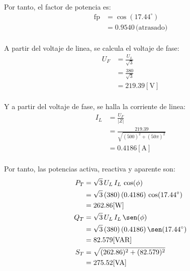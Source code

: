 \documentclass[letter,11pt]{article}
\begin{document}
Por tanto, el factor de potencia es:
\begin{equation*}
    \begin{split}
        \text{fp} &= \cos(17.44^{\circ})\\
                  &= 0.9540\,\text{(atrasado)}\\
    \end{split}
\end{equation*}

A partir del voltaje de linea, se calcula el voltaje de fase:
\begin{equation*}
    \begin{split}
        U_F &= \frac{U_L}{\sqrt{3}}\\
            &= \frac{380}{\sqrt{3}}\\
            &= 219.39[\text{V}]\\
    \end{split}
\end{equation*}

Y a partir del voltaje de fase, se halla la corriente de linea:
\begin{equation*}
    \begin{split}
        I_L &= \frac{U_F}{|Z|}\\
            &= \frac{219.39}{\sqrt{(500)^2+(50\pi)^2}}\\
            &= 0.4186[\text{A}]\\
    \end{split}
\end{equation*}

Por tanto, las potencias activa, reactiva y aparente son:
\begin{equation*}
    \begin{split}
        P_T &= \sqrt{3}\,U_L\,I_L\,\cos(\phi)\\
            &= \sqrt{3}\,(380)\,(0.4186)\,\cos(17.44^{\circ})\\
            &= 262.86[\text{W}]\\
        Q_T &= \sqrt{3}\,U_L\,I_L\,\sen(\phi)\\
            &= \sqrt{3}\,(380)\,(0.4186)\,\sen(17.44^{\circ})\\
            &= 82.579[\text{VAR}]\\
        S_T &= \sqrt{(262.86)^2+(82.579)^2}\\
            &= 275.52[\text{VA}]\\
    \end{split}
\end{equation*}
\end{document}
